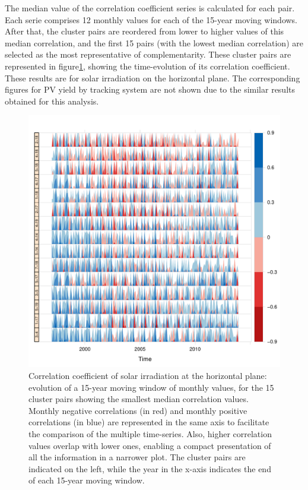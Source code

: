The median value of the correlation coefficient series is calculated for each pair. Each serie comprises 12 monthly values for each of the 15-year moving windows. After that, the cluster pairs are reordered from lower to higher values of this median correlation, and the first 15 pairs (with the lowest median correlation) are selected as the most representative of complementarity. These cluster pairs are represented in figure\ref{horizonplot_rad}, showing the time-evolution of its correlation coefficient. These results are for solar irradiation on the horizontal plane. The corresponding figures for PV yield by tracking system are not shown due to the similar results obtained for this analysis.

\begin{figure}[h!]
\includegraphics[scale=0.6]{figs/capitulo5/horizonplot_series_rad2}
\caption{Correlation coefficient of solar irradiation at the horizontal plane: evolution of a 15-year moving window of monthly values, for the 15 cluster pairs showing the smallest median correlation values. Monthly negative correlations (in red) and monthly positive correlations (in blue) are represented in the same axis to facilitate the comparison of the multiple time-series. Also, higher correlation values overlap with lower ones, enabling a compact presentation of all the information in a narrower plot. The cluster pairs are indicated on the left, while the year in the x-axis indicates the end of each 15-year moving window.}
\label{horizonplot_rad}
\end{figure}


